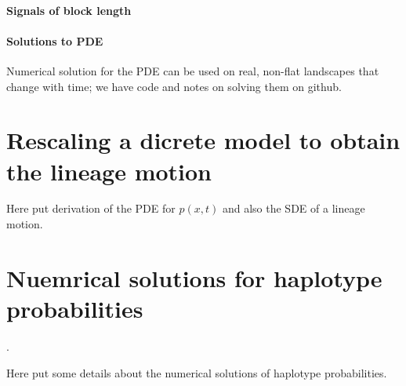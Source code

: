 \documentclass[12pt]{article}
\begin{document}
\paragraph{Signals of block length}

\paragraph{Solutions to PDE}
Numerical solution for the PDE can be used on real, non-flat landscapes that change with time;
we have code and notes on solving them on github.




\appendix

\section{Rescaling a dicrete model to obtain the lineage motion}
\label{apx:lineage_derivation}

Here put derivation of the PDE for $p(x,t)$ and also the SDE of a lineage motion.

\section{Nuemrical solutions for haplotype probabilities}
\label{apx:haplotype_calcs}.

Here put some details about the numerical solutions of haplotype probabilities.
\end{document}
